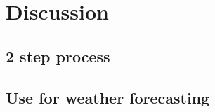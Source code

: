 \section{Discussion}
\label{sec: discussion}

\subsection{2 step process}

\subsection{Use for weather forecasting}